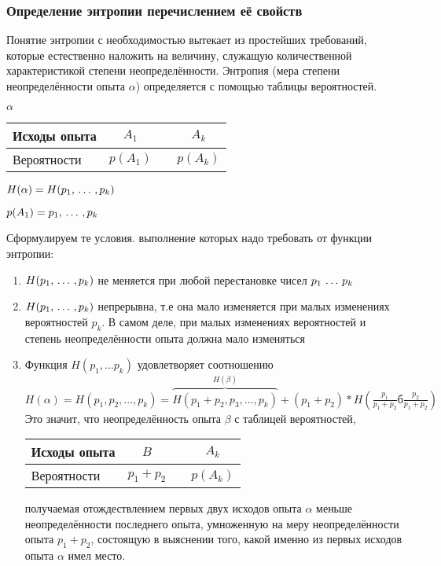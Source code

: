 ﻿\documentclass[a4paper,12pt]{report}
\begin{document}
	
	\subsubsection{Определение энтропии перечислением её свойств}
	
	Понятие энтропии с необходимостью вытекает из простейших требований, которые естественно наложить на величину, служащую количественной характеристикой степени неопределённости. Энтропия (мера степени неопределённости опыта $\alpha$) определяется с помощью таблицы вероятностей. 
	

	$\alpha$
	
	\begin{tabular}{|l|c|c|c|}
	\hline
	Исходы опыта & $A_1$ & \sudots & $A_k$ \\
	\hline
	Вероятности  & $p(A_1)$ & \sudots & $p(A_k)$\\
	\hline
	\end{tabular}
	
	
	$H(\alpha) = H(p_1,\,\ldots\, , p_k)$
	
	$p(A_1) = p_1, \,\ldots\, , p_k$
	
	Сформулируем те условия. выполнение которых надо требовать от функции энтропии:
	
	\begin{enumerate}
	
	\item	$H(p_1, \,\ldots\, ,p_k)$ не меняется при любой перестановке чисел $p_1 \,\ldots\, p_k$

	\item	$H(p_1, \,\ldots\, ,p_k)$ непрерывна, т.е она мало изменяется при малых изменениях вероятностей $p_k$. В самом деле, при малых изменениях вероятностей и степень неопределённости опыта должна мало изменяться

	\item	Функция $H(p_1,...p_k)$ удовлетворяет соотношению 
		$
		  H(\alpha) = H(p_1,p_2,...,p_k) 
		            = \overbrace{H(p_1+p_2,p_3,...,p_k)}^{H(\beta)} + (p_1+p_2) 
		            * H(\frac{p_1}{p_1+p_2}б\frac{p_2}{p_1+p_2})
		$
	Это значит, что неопределённость опыта $\beta$ с таблицей вероятностей,
	
		\begin{tabular}{|l|c|c|c|}
		\hline
		Исходы опыта & $B$ & \sudots & $A_k$\\
		\hline		
		Вероятности  & $p_1+p_2$ & \sudots & $p(A_k)$\\
		\hline
		\end{tabular}
		
	получаемая отождествлением первых двух исходов опыта $\alpha$ меньше неопределённости последнего опыта, умноженную на меру неопределённости опыта $p_1+p_2$, состоящую в выяснении того, какой именно из первых исходов опыта $\alpha$ имел место.
	\end{enumerate}		 
\end{document}
